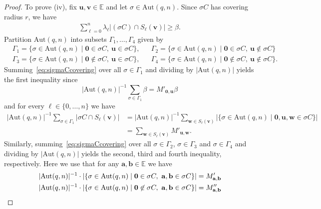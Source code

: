 \documentclass[10pt,a4paper]{article}
\newcommand{\E}{\mathbb{E}}
\theoremstyle{definition}
\newcommand{\uu}{\mathbf{u}}
\newcommand{\vv}{\mathbf{v}}
\newcommand{\ww}{\mathbf{w}}
\newcommand{\zero}{\mathbf{0}}
\newcommand{\Aut}{\mathrm{Aut}}
\begin{document}
\begin{proof}
To prove (iv), fix $\uu,\vv\in \E$ and let $\sigma\in \Aut(q,n)$. Since $\sigma C$ has covering radius $r$, we have
\begin{align} \label{eq:sigmaCcovering}
\sum_{\ell=0}^n \lambda_\ell |(\sigma C)\cap S_\ell(\vv)|\geq \beta.
\end{align}
Partition $\Aut(q,n)$ into subsets $\Gamma_1,\ldots ,\Gamma_4$ given by
\begin{align*}
&\Gamma_1=\{\sigma\in \Aut(q,n) \mid \zero\in \sigma C,\ \uu\in \sigma C\}, &&\Gamma_2=\{\sigma\in \Aut(q,n) \mid \zero\in \sigma C,\ \uu\not\in \sigma C\}\\
&\Gamma_3=\{\sigma\in \Aut(q,n) \mid \zero\not\in \sigma C,\ \uu\in \sigma C\}, &&\Gamma_4=\{\sigma\in \Aut(q,n) \mid \zero\not\in \sigma C,\ \uu\not\in \sigma C\}.
\end{align*}
Summing~\eqref{eq:sigmaCcovering} over all $\sigma\in \Gamma_1$ and dividing by $|\Aut(q,n)|$ yields the first inequality since
\[
|\Aut(q,n)|^{-1}\sum_{\sigma\in \Gamma_1} \beta=M'_{\zero,\uu} \beta
\]
and for every $\ell\in \{0,\ldots, n\}$ we have  
\begin{align*}
|\Aut(q,n)|^{-1}\sum_{\sigma\in \Gamma_1} |\sigma C\cap S_\ell(\vv)|&=|\Aut(q,n)|^{-1}\sum_{\ww\in S_\ell(\vv)}|\{\sigma\in \Aut(q,n) \mid \zero,\uu,\ww\in \sigma C\}|\\&=\sum_{\ww\in S_\ell(\vv)} M'_{\uu,\ww}.
\end{align*}
Similarly, summing~\eqref{eq:sigmaCcovering} over all $\sigma\in \Gamma_2$, $\sigma\in \Gamma_3$ and $\sigma\in \Gamma_4$ and dividing by $|\Aut(q,n)|$ yields the second, third and fourth inequality, respectively. Here we use that for any $\mathbf{a}, \mathbf{b}\in \E$ we have 
\begin{align*}
|\Aut(q,n)|^{-1}\cdot |\{\sigma\in \Aut(q,n)\mid \zero\in \sigma C,\ \mathbf{a},\mathbf{b}\in \sigma C\}|&=M'_{\mathbf{a},\mathbf{b}}\\
|\Aut(q,n)|^{-1}\cdot |\{\sigma\in \Aut(q,n)\mid \zero\not\in \sigma C,\ \mathbf{a},\mathbf{b}\in \sigma C\}|&=M''_{\mathbf{a},\mathbf{b}}
\qedhere
\end{align*}
\end{proof}
\end{document}
